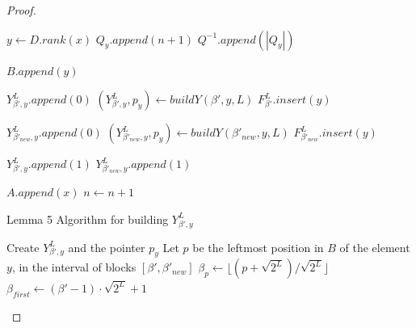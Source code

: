 \documentclass[runningheads]{llncs}
\begin{document}
\begin{proof}
\begin{algorithm}[H]
\begin{algorithmic}[1]
        \Else{}
        
        \State $y \gets D.rank(x)$
        \State $Q_{y}.append(n+1)$
        \State $Q^{-1}.append(|Q_{y}|)$

        \EndIf

        \State $B.append(y)$


                \State $Y_{\beta', y}^L.append(0)$
            \Else{}
                \State $(Y_{\beta', y}^L, p_y) \gets buildY(\beta', y, L) $
                \State $F_{\beta'}^L.insert(y)$
            \EndIf
        \EndIf


                    \State $Y_{\beta'_{new}, y}^L.append(0)$
                \Else{}
                    \State $(Y_{\beta'_{new}, y}^L, p_y) \gets buildY(\beta'_{new}, y, L) $
                    \State $F_{\beta'_{new}}^L.insert(y)$
                \EndIf
            \EndIf
        


                \State $Y_{\beta', y}^L.append(1)$
            \EndIf
                \State $Y_{\beta'_{new}, y}^L.append(1)$
            \EndIf
        \EndIf

        \State $A.append(x)$
        \State $n\gets n+1$
        
        \EndFunction
        \end{algorithmic}
    \end{algorithm}

    \begin{algorithm}[H]
        \caption{Lemma 5 Algorithm for building $Y_{\beta', y}^L$}\label{lemma4Build}
        \begin{algorithmic}[1]
        
            \State Create $Y_{\beta', y}^L$ and the pointer $p_y$
            \State Let $p$ be the leftmost position in $B$ of the element $y$, in the interval of blocks $[\beta', \beta'_{new}]$
            \State $\beta_p \gets \lfloor (p+\sqrt{2^L})/\sqrt{2^L} \rfloor$
            \State $\beta_{first} \gets (\beta'-1)\cdot \sqrt{2^L} + 1 $
            

\end{algorithmic}
\end{algorithm}
\end{proof}
\end{document}
